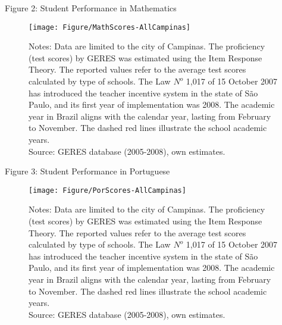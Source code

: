 \documentclass{beamer}
\begin{document}
\begin{frame} {Figure 2: Student Performance in Mathematics}
\begin{figure}[H]
\vspace{5pt}
\centering
\vspace{-8pt}
      \texttt{[image: Figure/MathScores-AllCampinas]}
       \vspace{-1pt}
     \label{fig:Math-RegStud}
     \begin{minipage}{0.86\textwidth} %
{{\fontsize{4}{4}\selectfont 
Notes: Data are limited to the city of Campinas. The proficiency (test scores) by GERES was estimated using the Item Response Theory. The reported values refer to the average test scores calculated by type of schools. The Law $N^{o}$ 1,017 of 15 October 2007 has introduced the teacher incentive system in the state of São Paulo, and its first year of implementation was 2008. The academic year in Brazil aligns with the calendar year, lasting from February to November. The dashed red lines illustrate the school academic years.  \\
Source: GERES database (2005-2008), own estimates.\par}}
\end{minipage}
\end{figure} 
\end{frame}



\begin{frame} {Figure 3: Student Performance in Portuguese}
\begin{figure}[H]
\vspace{5pt}
\centering
\vspace{-8pt}
      \texttt{[image: Figure/PorScores-AllCampinas]}
       \vspace{-1pt}
     \label{fig:Math-RegStud}
     \begin{minipage}{0.86\textwidth} %
{{\fontsize{4}{4}\selectfont 
Notes: Data are limited to the city of Campinas. The proficiency (test scores) by GERES was estimated using the Item Response Theory. The reported values refer to the average test scores calculated by type of schools. The Law $N^{o}$ 1,017 of 15 October 2007 has introduced the teacher incentive system in the state of São Paulo, and its first year of implementation was 2008. The academic year in Brazil aligns with the calendar year, lasting from February to November. The dashed red lines illustrate the school academic years.  \\
Source: GERES database (2005-2008), own estimates.\par}}
\end{minipage}
\end{figure} 
\end{frame} 
\end{document}
